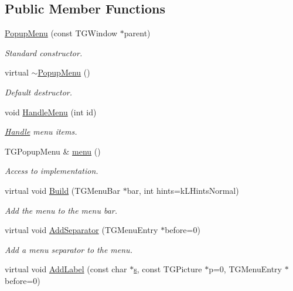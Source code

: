 \subsection*{Public Member Functions}
\begin{DoxyCompactItemize}
\item 
\hyperlink{class_d_d4hep_1_1_popup_menu_afaf85050694a622a0f3f62e2622bc5e9}{Popup\+Menu} (const T\+G\+Window $\ast$parent)
\begin{DoxyCompactList}\small\item\em Standard constructor. \end{DoxyCompactList}\item 
virtual \hyperlink{class_d_d4hep_1_1_popup_menu_aabdf2cc11c5e3cb57049041c459082fd}{$\sim$\+Popup\+Menu} ()
\begin{DoxyCompactList}\small\item\em Default destructor. \end{DoxyCompactList}\item 
void \hyperlink{class_d_d4hep_1_1_popup_menu_a8f5895d41102d89191fae441522cc53c}{Handle\+Menu} (int id)
\begin{DoxyCompactList}\small\item\em \hyperlink{class_d_d4hep_1_1_handle}{Handle} menu items. \end{DoxyCompactList}\item 
T\+G\+Popup\+Menu \& \hyperlink{class_d_d4hep_1_1_popup_menu_a3142e910b19e33ac04e9e260cb8981be}{menu} ()
\begin{DoxyCompactList}\small\item\em Access to implementation. \end{DoxyCompactList}\item 
virtual void \hyperlink{class_d_d4hep_1_1_popup_menu_a896a1626d79fd3d6ccb1c1e0657cf1ae}{Build} (T\+G\+Menu\+Bar $\ast$bar, int hints=k\+L\+Hints\+Normal)
\begin{DoxyCompactList}\small\item\em Add the menu to the menu bar. \end{DoxyCompactList}\item 
virtual void \hyperlink{class_d_d4hep_1_1_popup_menu_a08a0c971bdb2b8783ea5bff019c64171}{Add\+Separator} (T\+G\+Menu\+Entry $\ast$before=0)
\begin{DoxyCompactList}\small\item\em Add a menu separator to the menu. \end{DoxyCompactList}\item 
virtual void \hyperlink{class_d_d4hep_1_1_popup_menu_ab142c9486f37c01153674a6749d392dd}{Add\+Label} (const char $\ast$\hyperlink{_volumes_8cpp_a17ca6bfc8040d695d3cada22a4763d40}{s}, const T\+G\+Picture $\ast$p=0, T\+G\+Menu\+Entry $\ast$before=0)

\end{DoxyCompactItemize}
